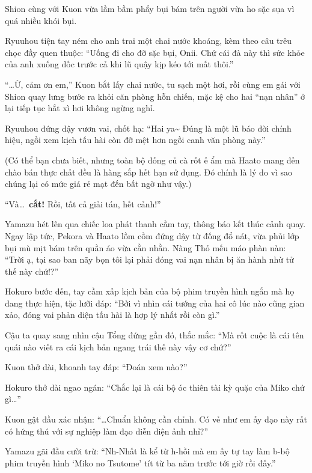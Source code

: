 \documentclass[../main.tex]{subfiles}
\begin{document}
Shion cùng với Kuon vừa lầm bầm phẩy bụi bám trên người vừa ho sặc sụa vì quá nhiều khói bụi.

Ryuuhou tiện tay ném cho anh trai một chai nước khoáng, kèm theo câu trêu chọc đầy quen thuộc: ``Uống đi cho đỡ sặc bụi, Onii. Chứ cái đà này thì sức khỏe của anh xuống dốc trước cả khi lũ quậy kịp kéo tới mất thôi.''

``\dots Ừ, cảm ơn em,'' Kuon bắt lấy chai nước, tu sạch một hơi, rồi cùng em gái với Shion quay lưng bước ra khỏi căn phòng hỗn chiến, mặc kệ cho hai ``nạn nhân'' ở lại tiếp tục hắt xì hơi không ngừng nghỉ.

Ryuuhou đứng dậy vươn vai, chốt hạ: ``Hai ya\~{} Đúng là một lũ báo đời chính hiệu, ngồi xem kịch tấu hài còn đỡ mệt hơn ngồi canh văn phòng này.''

(Có thể bạn chưa biết, nhưng toàn bộ đống củ cà rốt ế ẩm mà Haato mang đến chào bán thực chất đều là hàng sắp hết hạn sử dụng. Đó chính là lý do vì sao chúng lại có mức giá rẻ mạt đến bất ngờ như vậy.)

\omk

``Và\dots\ \textbf{cắt!} Rồi, tất cả giải tán, hết cảnh!''

Yamazu hét lên qua chiếc loa phát thanh cầm tay, thông báo kết thúc cảnh quay. Ngay lập tức, Pekora và  Haato lồm cồm đứng dậy từ đống đổ nát, vừa phủi lớp bụi mù mịt bám trên quần áo vừa cằn nhằn. Nàng Thỏ mếu máo phàn nàn: ``Trời ạ, tại sao ban nãy bọn tôi lại phải đóng vai nạn nhân bị ăn hành nhừ tử thế này chứ!?''

Hokuro bước đến, tay cầm xấp kịch bản của bộ phim truyền hình ngắn mà họ đang thực hiện, tặc lưỡi đáp: ``Bởi vì nhìn cái tướng của hai cô lúc nào cũng gian xảo, đóng vai phản diện tấu hài là hợp lý nhất rồi còn gì.''

Cậu ta quay sang nhìn cậu Tổng đứng gần đó, thắc mắc: ``Mà rốt cuộc là cái tên quái nào viết ra cái kịch bản ngang trái thế này vậy cơ chứ?''

Kuon thở dài, khoanh tay đáp: ``Đoán xem nào?''

Hokuro thở dài ngao ngán: ``Chắc lại là cái bộ óc thiên tài kỳ quặc của Miko chứ gì\dots''

Kuon gật đầu xác nhận: ``\dots Chuẩn không cần chỉnh. Có vẻ như em ấy dạo này rất có hứng thú với sự nghiệp làm đạo diễn điện ảnh nhỉ?''

Yamazu gãi đầu cười trừ: ``Nh-Nhất là kể từ h-hồi mà em ấy tự tay làm b-bộ phim truyền hình `Miko no Tsutome' tít từ ba năm trước tới giờ rồi đấy.''
\end{document}
